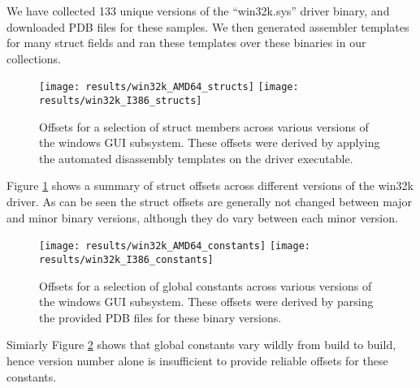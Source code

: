 We have collected 133 unique versions of the ``win32k.sys'' driver binary, and
downloaded PDB files for these samples. We then generated assembler templates
for many struct fields and ran these templates over these binaries in our
collections.

\begin{figure}[tb]
\begin{center}
\texttt{[image: results/win32k\_AMD64\_structs]}
\texttt{[image: results/win32k\_I386\_structs]}
\caption{Offsets for a selection of struct members across various versions of
  the windows GUI subsystem. These offsets were derived by applying the
  automated disassembly templates on the driver executable.
}
\label{win32k_structs}
\end{center}
\end{figure}

Figure \ref{win32k_structs} shows a summary of struct offsets across different
versions of the win32k driver. As can be seen the struct offsets are generally
not changed between major and minor binary versions, although they do vary
between each minor version.


\begin{figure}[tb]
\begin{center}
\texttt{[image: results/win32k\_AMD64\_constants]}
\texttt{[image: results/win32k\_I386\_constants]}
\caption{Offsets for a selection of global constants across various versions of
  the windows GUI subsystem. These offsets were derived by parsing the provided
  PDB files for these binary versions.
}
\label{win32k_constants}
\end{center}
\end{figure}

Simiarly Figure \ref{win32k_constants} shows that global constants vary wildly
from build to build, hence version number alone is insufficient to provide
reliable offsets for these constants.


